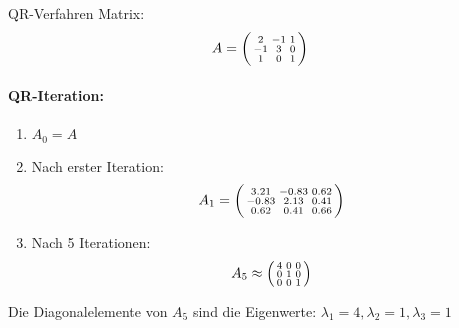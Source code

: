 \begin{example2}{QR-Verfahren}
Matrix:
$$A = \begin{psmallmatrix}
2 & -1 & 1\\
-1 & 3 & 0\\
1 & 0 & 1
\end{psmallmatrix}$$

\paragraph{QR-Iteration:}
\begin{enumerate}
    \item $A_0 = A$
    \item Nach erster Iteration:
    $$A_1 = \begin{psmallmatrix}
    3.21 & -0.83 & 0.62\\
    -0.83 & 2.13 & 0.41\\
    0.62 & 0.41 & 0.66
    \end{psmallmatrix}$$
    \item Nach 5 Iterationen:
    $$A_5 \approx \begin{psmallmatrix}
    4 & 0 & 0\\
    0 & 1 & 0\\
    0 & 0 & 1
    \end{psmallmatrix}$$
\end{enumerate}

Die Diagonalelemente von $A_5$ sind die Eigenwerte: $\lambda_1 = 4, \lambda_2 = 1, \lambda_3 = 1$
\end{example2}